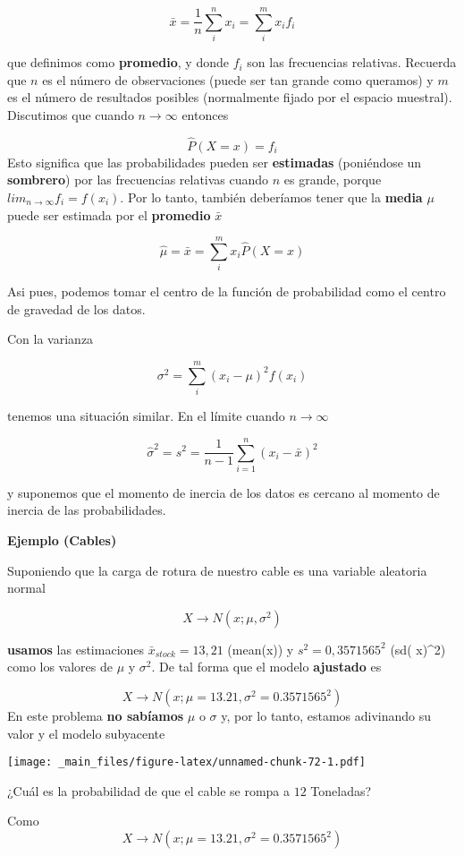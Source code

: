 \documentclass[
]{book}
\begin{document}
\[\bar{x}= \frac{1}{n} \sum_{i}^n x_i = \sum_{i}^m x_if_i\]

que definimos como \textbf{promedio}, y donde \(f_i\) son las frecuencias relativas. Recuerda que \(n\) es el número de observaciones (puede ser tan grande como queramos) y \(m\) es el número de resultados posibles (normalmente fijado por el espacio muestral). Discutimos que cuando \(n \rightarrow \infty\) entonces

\[\hat{P}(X=x)=f_i\]
Esto significa que las probabilidades pueden ser \textbf{estimadas} (poniéndose un \textbf{sombrero}) por las frecuencias relativas cuando \(n\) es grande, porque \(lim_{n\rightarrow \infty}f_i=f(x_i)\). Por lo tanto, también deberíamos tener que la \textbf{media} \(\mu\) puede ser estimada por el \textbf{promedio} \(\bar{x}\)

\[\hat{\mu}=\bar{x}= \sum_{i}^m x_i\hat{P}(X=x)\]

Asi pues, podemos tomar el centro de la función de probabilidad como el centro de gravedad de los datos.

Con la varianza

\[\sigma^2=\sum_{i}^m (x_i-\mu)^2f(x_i)\]

tenemos una situación similar. En el límite cuando \(n \rightarrow \infty\)

\[\hat{\sigma}^2=s^2=\frac{1}{n-1}\sum_{i=1}^n (x_i-\bar{x})^2\]

y suponemos que el momento de inercia de los datos es cercano al momento de inercia de las probabilidades.

\textbf{Ejemplo (Cables)}

Suponiendo que la carga de rotura de nuestro cable es una variable aleatoria normal

\[X \rightarrow N(x; \mu, \sigma^2)\]

\textbf{usamos} las estimaciones \(\bar{x}_{stock}=13,21\) (mean(x)) y \(s^2=0,3571565^2\) (sd( x)\^{}2) como los valores de \(\mu\) y \(\sigma^2\). De tal forma que el modelo \textbf{ajustado} es

\[X \rightarrow N(x; \mu=13.21, \sigma^2=0.3571565^2)\]
En este problema \textbf{no sabíamos} \(\mu\) o \(\sigma\) y, por lo tanto, estamos adivinando su valor y el modelo subyacente

\texttt{[image: \_main\_files/figure-latex/unnamed-chunk-72-1.pdf]}

¿Cuál es la probabilidad de que el cable se rompa a \(12\) Toneladas?

Como \[X \rightarrow N(x; \mu=13.21, \sigma^2=0.3571565^2)\]
\end{document}
